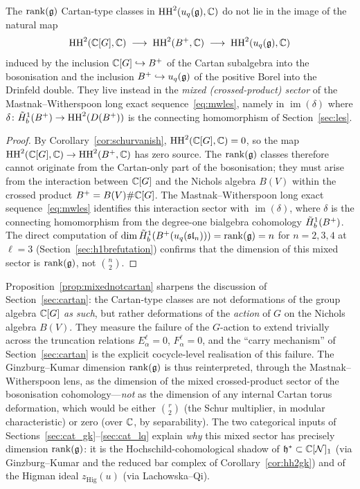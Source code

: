 \begin{proposition}
\label{prop:mixednotcartan}
The $\operatorname{rank}(\mathfrak{g})$ Cartan-type classes in $\operatorname{HH}^2(u_q(\mathfrak{g}), \mathbb{C})$ do not lie in the image of the natural map
\[
\operatorname{HH}^2(\mathbb{C}[G], \mathbb{C}) \;\longrightarrow\; \operatorname{HH}^2(B^{+}, \mathbb{C}) \;\longrightarrow\; \operatorname{HH}^2(u_q(\mathfrak{g}), \mathbb{C})
\]
induced by the inclusion $\mathbb{C}[G] \hookrightarrow B^{+}$ of the Cartan subalgebra into the bosonisation and the inclusion $B^{+} \hookrightarrow u_q(\mathfrak{g})$ of the positive Borel into the Drinfeld double. They live instead in the \emph{mixed (crossed-product) sector} of the Mastnak--Witherspoon long exact sequence~\eqref{eq:mwles}, namely in $\operatorname{im}(\delta)$ where $\delta \colon \tilde{H}^1_b(B^{+}) \to \operatorname{HH}^2(D(B^{+}))$ is the connecting homomorphism of Section~\ref{sec:les}.
\end{proposition}

\begin{proof}
By Corollary~\ref{cor:schurvanish}, $\operatorname{HH}^2(\mathbb{C}[G], \mathbb{C}) = 0$, so the map $\operatorname{HH}^2(\mathbb{C}[G], \mathbb{C}) \to \operatorname{HH}^2(B^{+}, \mathbb{C})$ has zero source. The $\operatorname{rank}(\mathfrak{g})$ classes therefore cannot originate from the Cartan-only part of the bosonisation; they must arise from the interaction between $\mathbb{C}[G]$ and the Nichols algebra $B(V)$ within the crossed product $B^{+} = B(V) \# \mathbb{C}[G]$. The Mastnak--Witherspoon long exact sequence~\eqref{eq:mwles} identifies this interaction sector with $\operatorname{im}(\delta)$, where $\delta$ is the connecting homomorphism from the degree-one bialgebra cohomology $\tilde{H}^1_b(B^{+})$. The direct computation of $\dim \tilde{H}^1_b(B^{+}(u_q(\mathfrak{sl}_n))) = \operatorname{rank}(\mathfrak{g}) = n$ for $n = 2, 3, 4$ at $\ell = 3$ (Section~\ref{sec:h1brefutation}) confirms that the dimension of this mixed sector is $\operatorname{rank}(\mathfrak{g})$, not $\binom{n}{2}$.
\end{proof}

\begin{remark}
\label{rem:schurfinal}
Proposition~\ref{prop:mixednotcartan} sharpens the discussion of Section~\ref{sec:cartan}: the Cartan-type classes are not deformations of the group algebra $\mathbb{C}[G]$ \emph{as such}, but rather deformations of the \emph{action} of $G$ on the Nichols algebra $B(V)$. They measure the failure of the $G$-action to extend trivially across the truncation relations $E_\alpha^\ell = 0$, $F_\alpha^\ell = 0$, and the ``carry mechanism'' of Section~\ref{sec:cartan} is the explicit cocycle-level realisation of this failure. The Ginzburg--Kumar dimension $\operatorname{rank}(\mathfrak{g})$ is thus reinterpreted, through the Mastnak--Witherspoon lens, as the dimension of the mixed crossed-product sector of the bosonisation cohomology---\emph{not} as the dimension of any internal Cartan torus deformation, which would be either $\binom{r}{2}$ (the Schur multiplier, in modular characteristic) or zero (over $\mathbb{C}$, by separability). The two categorical inputs of Sections~\ref{sec:cat_gk}--\ref{sec:cat_lq} explain \emph{why} this mixed sector has precisely dimension $\operatorname{rank}(\mathfrak{g})$: it is the Hochschild-cohomological shadow of $\mathfrak{h}^* \subset \mathbb{C}[\mathcal{N}]_1$ (via Ginzburg--Kumar and the reduced bar complex of Corollary~\ref{cor:hh2gk}) and of the Higman ideal $z_{\mathrm{Hig}}(u)$ (via Lachowska--Qi).
\end{remark}
